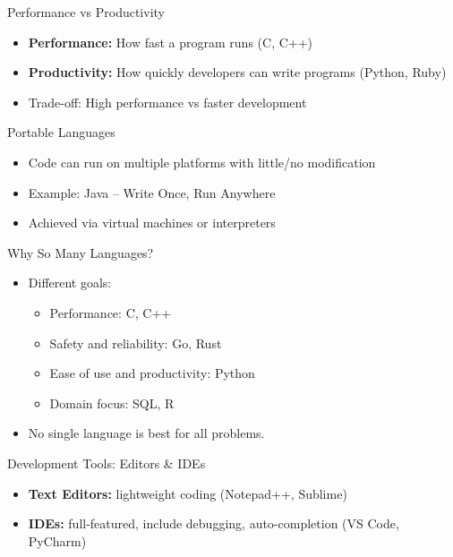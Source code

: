 \documentclass[12pt, aspectratio=169]{beamer}
\begin{document}
    \begin{frame}{Performance vs Productivity}
        \begin{itemize}
            \item \textbf{Performance:} How fast a program runs (C, C++)
            \item \textbf{Productivity:} How quickly developers can write programs (Python, Ruby)
            \item Trade-off: High performance vs faster development
        \end{itemize}
    \end{frame}


    \begin{frame}{Portable Languages}
        \begin{itemize}
            \item Code can run on multiple platforms with little/no modification
            \item Example: Java -- Write Once, Run Anywhere
            \item Achieved via virtual machines or interpreters
        \end{itemize}
    \end{frame}


    \begin{frame}{Why So Many Languages?}
        \begin{itemize}
            \item Different goals:
            \begin{itemize}
                \item Performance: C, C++
                \item Safety and reliability: Go, Rust
                \item Ease of use and productivity: Python
                \item Domain focus: SQL, R
            \end{itemize}
            \item No single language is best for all problems.
        \end{itemize}
    \end{frame}


    \begin{frame}{Development Tools: Editors \& IDEs}
        \begin{itemize}
            \item \textbf{Text Editors:} lightweight coding (Notepad++, Sublime)
            \item \textbf{IDEs:} full-featured, include debugging, auto-completion (VS Code, PyCharm)
        \end{itemize}
    \end{frame}
\end{document}
